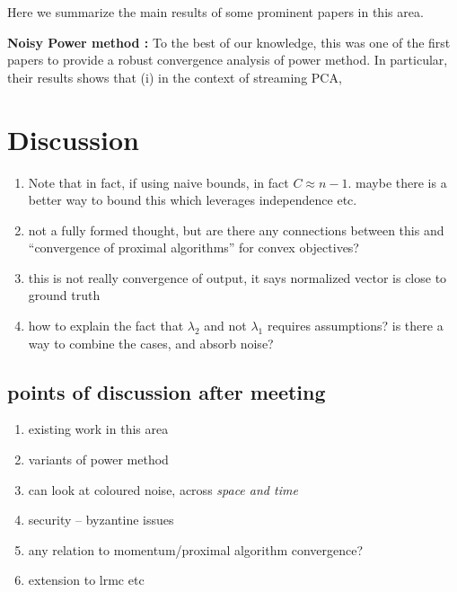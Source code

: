 \documentclass[10pt]{article}
\begin{document}
Here we summarize the main results of some prominent papers in this area. 

{\bf Noisy Power method \cite{noisy_pm}:} To the best of our knowledge, this was one of the first papers to provide a robust convergence analysis of power method. In particular, their results shows that (i) in the context of streaming PCA, 

\color{blue}
\section{Discussion}
\begin{enumerate}
\item Note that in fact, if using naive bounds, in fact $C \approx n - 1$. maybe there is a better way to bound this which leverages independence etc. 
\item not a fully formed thought, but are there any connections between this and ``convergence of proximal algorithms'' for convex objectives?
\item this is not really convergence of output, it says normalized vector is close to ground truth
\item how to explain the fact that $\lambda_2$ and not $\lambda_1$ requires assumptions? is there a way to combine the cases, and absorb noise?
\end{enumerate}

\subsection{points of discussion after meeting}

\begin{enumerate}
\item existing work in this area
\item variants of power method
\item can look at coloured noise, across \em{space and time}
\item security -- byzantine issues
\item any relation to momentum/proximal algorithm convergence?
\item extension to lrmc etc
\end{enumerate}

\color{black}


\end{document}
